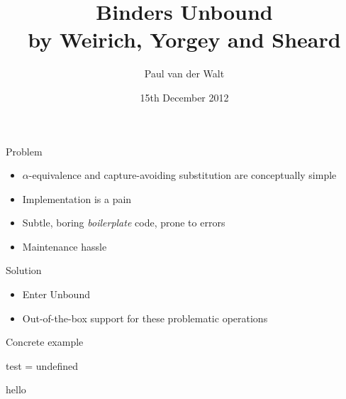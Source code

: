 \documentclass[]{beamer}
\author{Paul van der Walt}
\institute{Utrecht University}
\date{15th December 2012}
\title[Binders Unbound]{Binders Unbound\\\small{by Weirich, Yorgey and Sheard}}
\begin{document}
\begin{frame}
    \maketitle
\end{frame}





\begin{frame}
    \tableofcontents
\end{frame}

\begin{frame}{Problem}
    \begin{itemize}
        \item $\alpha$-equivalence and capture-avoiding substitution are conceptually simple
        \item Implementation is a pain
        \item Subtle, boring \emph{boilerplate} code, prone to errors
        \item Maintenance hassle
    \end{itemize}
\end{frame}

\begin{frame}{Solution}
    \begin{itemize}
        \item Enter Unbound
        \item Out-of-the-box support for these problematic operations
    \end{itemize}
\end{frame}

\begin{frame}{Concrete example}
    \begin{example}
        \begin{spec}
            test = undefined
        \end{spec}
    \end{example}
\end{frame}



\begin{frame}
    hello\cite{weirich2011binders}
\end{frame}


\begin{frame}
    {} %
    
    
\end{frame}
\end{document}
